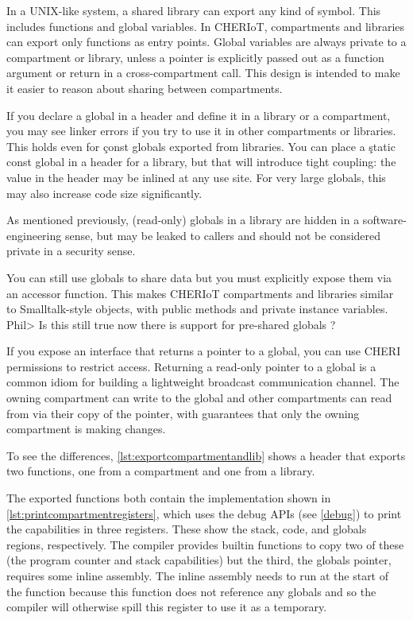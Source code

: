 In a UNIX-like system, a shared library can export any kind of symbol.
This includes functions and global variables.
In CHERIoT, compartments and libraries can export only functions as entry points.
Global variables are always private to a compartment or library, unless a pointer is explicitly passed out as a function argument or return in a cross-compartment call.
This design is intended to make it easier to reason about sharing between compartments.

If you declare a global in a header and define it in a library or a compartment, you may see linker errors if you try to use it in other compartments or libraries.
This holds even for \c{const} globals exported from libraries.
You can place a \c{static const} global in a header for a library, but that will introduce tight coupling: the value in the header may be inlined at any use site.
For very large globals, this may also increase code size significantly.

\begin{note}
As mentioned previously, (read-only) globals in a library are hidden in a software-engineering sense, but may be leaked to callers and should not be considered private in a security sense.
\end{note}

You can still use globals to share data but you must explicitly expose them via an accessor function.
This makes CHERIoT compartments and libraries similar to Smalltalk-style objects, with public methods and private instance variables.
Phil> Is this still true now there is support for pre-shared globals ?

If you expose an interface that returns a pointer to a global, you can use CHERI permissions to restrict access.
Returning a read-only pointer to a global is a common idiom for building a lightweight broadcast communication channel.
The owning compartment can write to the global and other compartments can read from via their copy of the pointer, with guarantees that only the owning compartment is making changes.

To see the differences, \ref{lst:exportcompartmentandlib} shows a header that exports two functions, one from a compartment and one from a library.

\codelisting[filename=examples/library_or_compartment/interface.h,marker=exports,label=lst:exportcompartmentandlib,caption="A header defining library and compartment exports."]{}

The exported functions both contain the implementation shown in \ref{lst:printcompartmentregisters}, which uses the debug APIs (see \ref{debug}) to print the capabilities in three registers.
These show the stack, code, and globals regions, respectively.
The compiler provides builtin functions to copy two of these (the program counter and stack capabilities) but the third, the globals pointer, requires some inline assembly.
The inline assembly needs to run at the start of the function because this function does not reference any globals and so the compiler will otherwise spill this register to use it as a temporary.

